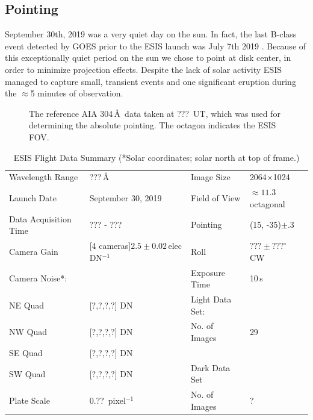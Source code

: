 	\subsection{Pointing} \label{sec:point}
		September 30th, 2019 was a very quiet day on the sun.  
		In fact, the last  B-class event detected by GOES \citep{GOES} prior to the ESIS launch was July 7th 2019 .  
		Because of this exceptionally quiet period on the sun we chose to point at disk center, in order to minimize projection effects.  
		Despite the lack of solar activity ESIS managed to capture  small, transient events and one significant eruption during the $\approx$5 minutes of observation.
		
		\begin{figure}[ht]
			\begin{center}
				\caption{The reference AIA 304\,\AA\ data taken at ???~UT, which was used for determining the absolute pointing. The octagon indicates the ESIS FOV.}
				\label{fig:fov}
			\end{center}
		\end{figure}
	
		\begin{center}
			\begin{table}
				\caption{ESIS Flight Data Summary (*Solar coordinates; solar north at top of frame.)}
				\label{tab:data_info}
				\begin{tabular}{ll | l l}\hline
					Wavelength Range &   ???\,\AA\  & Image Size  & 2064$\times$1024\\
					Launch Date & September 30, 2019 & Field of View  & $\approx 11.3$\arcmin octagonal \\
					Data Acquisition Time & ??? - ??? & Pointing  & (15\arcsec, -35\arcsec)$\pm .3$\arcsec \jdp{???}  \\
					Camera Gain &   [4 cameras]$2.5 \pm 0.02$\,elec DN$^{-1}$ & Roll & $??? \pm ???^\circ$ CW \\
					Camera Noise*: & & Exposure Time & 10\,s\\
					\hspace{0.2in}NE Quad & [?,?,?,?] DN & Light Data Set: &\\
					\hspace{0.2in}NW Quad & [?,?,?,?] DN & \hspace{0.2in}No. of Images & 29\\
					\hspace{0.2in}SE Quad  & [?,?,?,?] DN & &\\
					\hspace{0.2in}SW Quad  & [?,?,?,?] DN & Dark Data Set & \\
					Plate Scale  & 0.??\arcsec\ pixel$^{-1}$ &  \hspace{0.2in}No. of Images & ? \\
					\hline
				\end{tabular}
			\end{table}
		\end{center}
		

